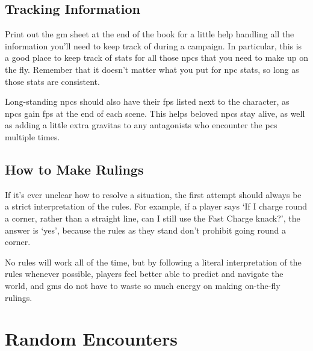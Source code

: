 \begin{multicols}{2}
\subsection{Tracking Information}

Print out the \gls{gm} sheet at the end of the book for a little help handling all the information you'll need to keep track of during a campaign.
In particular, this is a good place to keep track of stats for all those \glspl{npc} that you need to make up on the fly.
Remember that it doesn't matter what you put for \gls{npc} stats, so long as those stats are consistent.

Long-standing \glspl{npc} should also have their \glspl{fp} listed next to the character, as \glspl{npc} gain \glspl{fp} at the end of each scene.
This helps beloved \glspl{npc} stay alive, as well as adding a little extra gravitas to any antagonists who encounter the \glspl{pc} multiple times.

\subsection{How to Make Rulings}

If it's ever unclear how to resolve a situation, the first attempt should always be a strict interpretation of the rules.
For example, if a player says `If I charge round a corner, rather than a straight line, can I still use the Fast Charge knack?', the answer is `yes', because the rules as they stand don't prohibit going round a corner.

No rules will work all of the time, but by following a literal interpretation of the rules whenever possible, players feel better able to predict and navigate the world, and \glspl{gm} do not have to waste so much energy on making on-the-fly rulings.

\end{multicols}

\section{Random Encounters}
\label{encounters}

